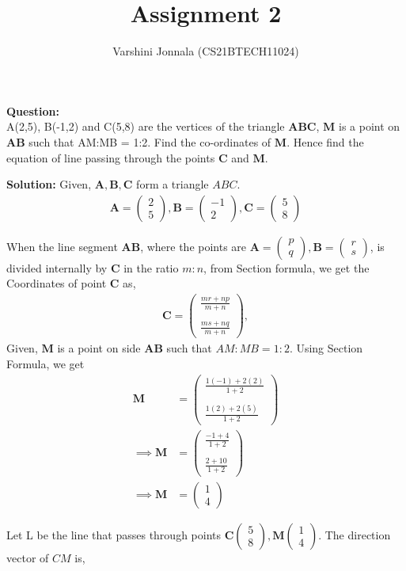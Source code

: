 \documentclass[journal,12pt,twocolumn]{IEEEtran}
\title{Assignment 2}
\author{Varshini Jonnala (CS21BTECH11024)}
\let\vec\mathbf
\newcommand{\myvec}[1]{\ensuremath{\begin{pmatrix}#1\end{pmatrix}}}
\begin{document}
    \maketitle
    \textbf{Question: }\\
      A(2,5), B(-1,2) and C(5,8) are the vertices of the triangle $\vec{ABC}$, $\vec{M}$ is a point on $\vec{AB}$ such that AM:MB = 1:2. Find the co-ordinates of $\vec{M}$. Hence find the equation of line passing through the points $\vec{C}$ and $\vec{M}$.


    \textbf{Solution: }
     Given, $\vec{A}, \vec{B}, \vec{C}$ form a triangle $ABC$.
	\begin{align}
		\vec{A} = \myvec{2 \\ 5} ,
		\vec{B} = \myvec{-1 \\ 2},
		\vec{C} = \myvec{5 \\ 8}
	\end{align}

    When the line segment $\vec{AB}$, where the points are $\vec{A}=\myvec{p\\q}, \vec{B}=\myvec{r\\s}$, is divided internally by $\vec{C}$ in the ratio $m:n$, from Section formula,
    we get the Coordinates of point $\vec{C}$ as,
    \begin{align} 
        \vec{C} = \myvec{\frac{mr+np}{m+n}\\\\ \frac{ms+nq}{m+n}},
    \end{align}	
    Given, $\vec{M}$ is a point on side $\vec{AB}$ such that $AM:MB = 1:2$. 
        Using Section Formula, we get
    \begin{align}
        \vec{M} &= \myvec{\frac{1(-1)+2(2)}{1+2}\\\\ \frac{1(2)+2(5)}{1+2}}\\
        \implies \vec{M} &= \myvec{\frac{-1+4}{1+2}\\\\ \frac{2+10}{1+2}}\\
        \implies \vec{M} &= \myvec{1\\4}
    \end{align}
    
    Let L be the line that passes through points $\vec{C}\myvec{5\\8}, \vec{M}\myvec{1\\4}$.
    The direction vector of $CM$ is,
    
\end{document}
